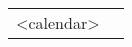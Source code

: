 {\noindent\renewcommand{\arraystretch}{0}%
\begin{tabularx}{\textwidth}{@{}l X@{}}
<calendar> &
\Repeat{\myQuarterlyLines}{\myLineOrd}
\end{tabularx}}